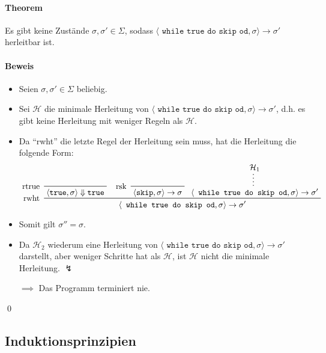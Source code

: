 				\paragraph{Theorem}
					Es gibt keine Zustände $ \sigma, \sigma' \in \Sigma $, sodass $ \langle \texttt{ while true do skip od}, \sigma \rangle \rightarrow \sigma' $ herleitbar ist.


				\paragraph{Beweis}
					\begin{itemize}
						\item Seien $ \sigma, \sigma' \in \Sigma $ beliebig.
						\item Sei $ \mathcal{H} $ die minimale Herleitung von $ \langle \texttt{ while true do skip od}, \sigma \rangle \rightarrow \sigma' $, d.h. es gibt keine Herleitung mit weniger Regeln als $ \mathcal{H} $.
						\item Da \enquote{rwht} die letzte Regel der Herleitung sein muss, hat die Herleitung die folgende Form:
							\begin{equation*}
								\prftree[l]
								{ rwht }
								{ \prftree[l]{ rtrue }{ \langle \texttt{true}, \sigma \rangle \Downarrow \texttt{true} } }
								{ \prftree[l]{ rsk }{ \langle \texttt{skip}, \sigma \rangle \rightarrow \sigma } }
								{ \prfsummary{\mathcal{H} _ 1}{ \langle \texttt{ while true do skip od}, \sigma \rangle \rightarrow \sigma' } }
								{ \langle \texttt{ while true do skip od}, \sigma \rangle \rightarrow \sigma' }
							\end{equation*}
						\item Somit gilt $ \sigma'' = \sigma $.
						\item Da $ \mathcal{H} _ 2 $ wiederum eine Herleitung von $ \langle \texttt{ while true do skip od}, \sigma \rangle \rightarrow \sigma' $ darstellt, aber weniger Schritte hat als $ \mathcal{H} $, ist $ \mathcal{H} $ nicht die minimale Herleitung. $ \lightning $
						\item[$ \implies $] Das Programm terminiert nie.
					\end{itemize}

					\qed

		\subsection{Induktionsprinzipien}
